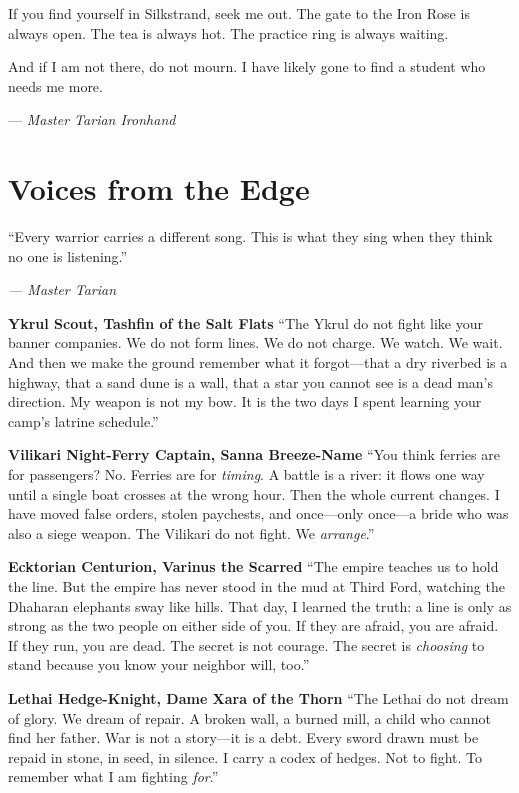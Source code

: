 \documentclass[9pt,a5paper]{extbook}
\begin{document}
If you find yourself in Silkstrand, seek me out. The gate to the Iron Rose is always open. The tea is always hot. The practice ring is always waiting.

And if I am not there, do not mourn. I have likely gone to find a student who needs me more.

\vspace{0.5cm}
\hfill --- \textit{Master Tarian Ironhand}

\clearpage

\chapter{Voices from the Edge}

\epigraph{``Every warrior carries a different song. This is what they sing when they think no one is listening.''}{\textit{--- Master Tarian}}

\vspace{0.5cm}

\noindent\textbf{Ykrul Scout, Tashfin of the Salt Flats}
``The Ykrul do not fight like your banner companies. We do not form lines. We do not charge. We watch. We wait. And then we make the ground remember what it forgot---that a dry riverbed is a highway, that a sand dune is a wall, that a star you cannot see is a dead man's direction. My weapon is not my bow. It is the two days I spent learning your camp's latrine schedule.''

\vspace{0.3cm}
\noindent\textbf{Vilikari Night-Ferry Captain, Sanna Breeze-Name}
``You think ferries are for passengers? No. Ferries are for \textit{timing}. A battle is a river: it flows one way until a single boat crosses at the wrong hour. Then the whole current changes. I have moved false orders, stolen paychests, and once---only once---a bride who was also a siege weapon. The Vilikari do not fight. We \textit{arrange}.''

\vspace{0.3cm}
\noindent\textbf{Ecktorian Centurion, Varinus the Scarred}
``The empire teaches us to hold the line. But the empire has never stood in the mud at Third Ford, watching the Dhaharan elephants sway like hills. That day, I learned the truth: a line is only as strong as the two people on either side of you. If they are afraid, you are afraid. If they run, you are dead. The secret is not courage. The secret is \textit{choosing} to stand because you know your neighbor will, too.''

\vspace{0.3cm}
\noindent\textbf{Lethai Hedge-Knight, Dame Xara of the Thorn}
``The Lethai do not dream of glory. We dream of repair. A broken wall, a burned mill, a child who cannot find her father. War is not a story---it is a debt. Every sword drawn must be repaid in stone, in seed, in silence. I carry a codex of hedges. Not to fight. To remember what I am fighting \textit{for}.''
\end{document}
